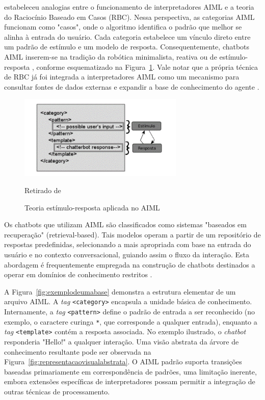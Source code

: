 \documentclass[14pt,a4paper,oneside]{book}
\begin{document}
\cite{Wallace2000} estabeleceu analogias entre o funcionamento de interpretadores AIML e a teoria do Raciocínio Baseado em Casos (RBC). Nessa perspectiva, as categorias AIML funcionam como "casos", onde o algoritmo identifica o padrão que melhor se alinha à entrada do usuário. Cada categoria estabelece um vínculo direto entre um padrão de estímulo e um modelo de resposta. Consequentemente, chatbots AIML inserem-se na tradição da robótica minimalista, reativa ou de estímulo-resposta \cite{Wallace2000}, conforme esquematizado na Figura~\ref{fig:teoriaestimulo}. Vale notar que a própria técnica de RBC já foi integrada a interpretadores AIML como um mecanismo para consultar fontes de dados externas e expandir a base de conhecimento do agente \cite{Kraus2008}.

\begin{figure}
    \centering
    \caption{Teoria estímulo-resposta aplicada no AIML}
    \includegraphics[width=0.7\textwidth]{./fig/image10.png} %
    \label{fig:teoriaestimulo}
    \vspace{0.2cm}
    {\footnotesize 
	
	Retirado de \cite{Lima2017}}
\end{figure}

Os chatbots que utilizam AIML são classificados como sistemas "baseados em recuperação" (retrieval-based). Tais modelos operam a partir de um repositório de respostas predefinidas, selecionando a mais apropriada com base na entrada do usuário e no contexto conversacional, guiando assim o fluxo da interação. Esta abordagem é frequentemente empregada na construção de chatbots destinados a operar em domínios de conhecimento restritos \cite{Borah2019}.

A Figura~\ref{fig:exemplodeumabase} demonstra a estrutura elementar de um arquivo AIML. A \emph{tag} \texttt{<category>} encapsula a unidade básica de conhecimento. Internamente, a \emph{tag} \texttt{<pattern>} define o padrão de entrada a ser reconhecido (no exemplo, o caractere curinga \texttt{*}, que corresponde a qualquer entrada), enquanto a \emph{tag} \texttt{<template>} contém a resposta associada. No exemplo ilustrado, o \emph{chatbot} responderia "Hello!" a qualquer interação. Uma visão abstrata da árvore de conhecimento resultante pode ser observada na Figura~\ref{fig:representacaovisualabstrata}. O AIML padrão suporta transições baseadas primariamente em correspondência de padrões, uma limitação inerente, embora extensões específicas de interpretadores possam permitir a integração de outras técnicas de processamento.
\end{document}
